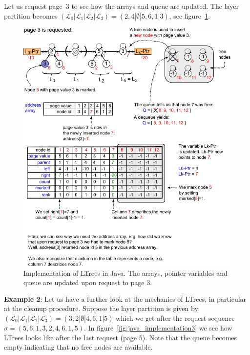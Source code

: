 \documentclass[a4paper,12pt, titlepage]{article}  %
\newcommand{\cl}{\mathcal{L}}   %
\begin{document}
Let us request page~3 to see how the arrays and queue are updated. The layer partition becomes 
$( \cl_0 | \cl_1 | \cl_2 | \cl_3) = (2,4 | \emptyset | 5,6,1 | 3)$, see figure~\ref{fig:java_implementation2}.

\begin{figure}[htp]
	\centering
	\includegraphics[scale=0.95]{./figures/java_implementation2.pdf}
	\caption{Implementation of LTrees in Java. The arrays, pointer variables and queue are updated upon request to page 3.} 
	\label{fig:java_implementation2}
\end{figure}

\noindent \textbf{Example 2}: Let us have a further look at the mechanics of LTrees, in particular 
at the cleanup procedure. Suppose the layer partition is given by 
$( \cl_0 | \cl_1 | \cl_2 | \cl_3) = (3,2 | \emptyset | 4,6,1 | 5)$ which we get after the request 
sequence $\sigma = (5,6,1,3,2,4,6,1,5)$. In figure~\ref{fig:java_implementation3} we see how LTrees looks like after the
last request (page 5). Note that the queue becomes empty indicating that no free nodes are available. 
\end{document}
